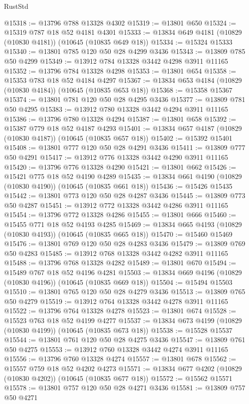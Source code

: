 \begin{lexlean}{RustStd}
\begin{coremodule}
@15318 := @13796 @788 @13328 @4302
@15319 := @13801 @650
@15324 := @15319 @787 @18 @52 @4181 @4301
@15333 := @13834 @649 @4181 (@10829 (@10830 @4181)) (@10645 (@10835 @649 @18))
@15334 := @15324 @15333
@15340 := @13801 @785 @120 @50 @28 @4299 @3436
@15343 := @13809 @785 @50 @4299
@15349 := @13912 @784 @13328 @3442 @4298 @3911 @11165
@15352 := @13796 @784 @13328 @4298
@15353 := @13801 @654
@15358 := @15353 @783 @18 @52 @4184 @4297
@15367 := @13834 @653 @4184 (@10829 (@10830 @4184)) (@10645 (@10835 @653 @18))
@15368 := @15358 @15367
@15374 := @13801 @781 @120 @50 @28 @4295 @3436
@15377 := @13809 @781 @50 @4295
@15383 := @13912 @780 @13328 @3442 @4294 @3911 @11165
@15386 := @13796 @780 @13328 @4294
@15387 := @13801 @658
@15392 := @15387 @779 @18 @52 @4187 @4293
@15401 := @13834 @657 @4187 (@10829 (@10830 @4187)) (@10645 (@10835 @657 @18))
@15402 := @15392 @15401
@15408 := @13801 @777 @120 @50 @28 @4291 @3436
@15411 := @13809 @777 @50 @4291
@15417 := @13912 @776 @13328 @3442 @4290 @3911 @11165
@15420 := @13796 @776 @13328 @4290
@15421 := @13801 @662
@15426 := @15421 @775 @18 @52 @4190 @4289
@15435 := @13834 @661 @4190 (@10829 (@10830 @4190)) (@10645 (@10835 @661 @18))
@15436 := @15426 @15435
@15442 := @13801 @773 @120 @50 @28 @4287 @3436
@15445 := @13809 @773 @50 @4287
@15451 := @13912 @772 @13328 @3442 @4286 @3911 @11165
@15454 := @13796 @772 @13328 @4286
@15455 := @13801 @666
@15460 := @15455 @771 @18 @52 @4193 @4285
@15469 := @13834 @665 @4193 (@10829 (@10830 @4193)) (@10645 (@10835 @665 @18))
@15470 := @15460 @15469
@15476 := @13801 @769 @120 @50 @28 @4283 @3436
@15479 := @13809 @769 @50 @4283
@15485 := @13912 @768 @13328 @3442 @4282 @3911 @11165
@15488 := @13796 @768 @13328 @4282
@15489 := @13801 @670
@15494 := @15489 @767 @18 @52 @4196 @4281
@15503 := @13834 @669 @4196 (@10829 (@10830 @4196)) (@10645 (@10835 @669 @18))
@15504 := @15494 @15503
@15510 := @13801 @765 @120 @50 @28 @4279 @3436
@15513 := @13809 @765 @50 @4279
@15519 := @13912 @764 @13328 @3442 @4278 @3911 @11165
@15522 := @13796 @764 @13328 @4278
@15523 := @13801 @674
@15528 := @15523 @763 @18 @52 @4199 @4277
@15537 := @13834 @673 @4199 (@10829 (@10830 @4199)) (@10645 (@10835 @673 @18))
@15538 := @15528 @15537
@15544 := @13801 @761 @120 @50 @28 @4275 @3436
@15547 := @13809 @761 @50 @4275
@15553 := @13912 @760 @13328 @3442 @4274 @3911 @11165
@15556 := @13796 @760 @13328 @4274
@15557 := @13801 @678
@15562 := @15557 @759 @18 @52 @4202 @4273
@15571 := @13834 @677 @4202 (@10829 (@10830 @4202)) (@10645 (@10835 @677 @18))
@15572 := @15562 @15571
@15578 := @13801 @757 @120 @50 @28 @4271 @3436
@15581 := @13809 @757 @50 @4271

\end{coremodule}
\end{lexlean}
